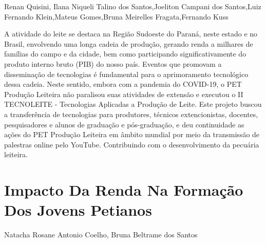Renan Quisini, Ilana Niqueli Talino dos Santos,Joeliton Campani dos Santos,Luiz Fernando Klein,Mateus Gomes,Bruna Meirelles Fragata,Fernando Kuss

A atividade do leite se destaca na Região Sudoeste do Paraná, neste estado e no Brasil, envolvendo uma longa cadeia de produção, gerando renda a milhares de famílias do campo e da cidade, bem como participando significativamente do produto interno bruto (PIB) do nosso país. Eventos que promovam a disseminação de tecnologias é fundamental para o aprimoramento tecnológico dessa cadeia. Neste sentido, embora com a pandemia do COVID-19, o PET Produção Leiteira não paralisou suas atividades de extensão e executou o II TECNOLEITE - Tecnologias Aplicadas a Produção de Leite. Este projeto buscou a transferência de tecnologias para produtores, técnicos extencionistas, docentes, pesquisadores e alunos de graduação e pós-graduação, e deu continuidade as ações do PET Produção Leiteira em âmbito mundial por meio da transmissão de palestras online pelo YouTube. Contribuindo com o desenvolvimento da pecuária leiteira.




\section*{Impacto Da Renda Na Formação Dos Jovens Petianos}

Natacha Rosane Antonio Coelho, Bruna Beltrame dos Santos

